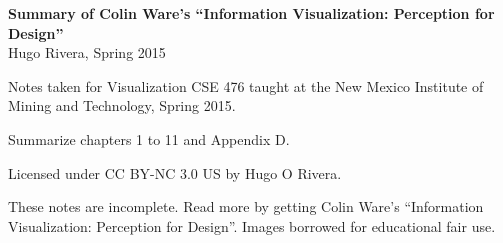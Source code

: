 \documentclass[letterpaper,10pt]{article}
\begin{document}
\begin{center}
\textbf{\huge
  Summary of Colin Ware's ``Information Visualization: Perception for Design''
}
\\
{\Large Hugo Rivera, Spring 2015}
\end{center}

Notes taken for Visualization CSE 476 taught at the New Mexico Institute of Mining and Technology, Spring 2015.

Summarize chapters 1 to 11 and Appendix D.

\dosecttoc
\setlength{\mtcindent}{0pt}
\setcounter{tocdepth}{1}

\begin{multicols}{2}
\tableofcontents
\end{multicols}

\def\stctitle{}

 
 
 
 
 
 
 
 
 
 
 
\begin{multicols}{2}

\end{multicols}

Licensed under CC BY-NC 3.0 US by Hugo O Rivera.

{\itstyle These notes are incomplete. Read more by getting Colin Ware's ``Information Visualization: Perception for Design''. Images borrowed for educational fair use.}
\end{document}
